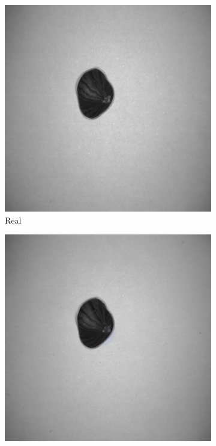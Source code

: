 \documentclass[12pt,DIV14,BCOR12mm,a4paper,footinclude=false,headinclude,parskip=half-,twoside,openright,cleardoublepage=empty,toc=index,bibliography=totoc,listof=totoc]{scrreprt}
\numberwithin{equation}{chapter}
\begin{document}
\begin{figure}
    \begin{minipage}[H]{\linewidth}
        \centering
        \begin{minipage}[H]{0.5\linewidth} %
            \centering
            \begin{subfigure}[t]{0.48\linewidth}
                \centering
                \includegraphics[width=\linewidth]{../media/nut_real_1.png}
                \caption{Real}
            \end{subfigure}%
            \hfill
            \begin{subfigure}[t]{0.48\linewidth}
                \centering
                \includegraphics[width=\linewidth]{../media/nut_generated_1_1.png}

\end{subfigure}
\end{minipage}
\end{minipage}
\end{figure}
\end{document}
